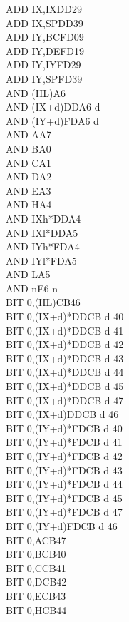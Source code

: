 \documentclass[oneside,a4paper]{book}
\begin{document}
\begin{multicols}{3}
{\begin{tabbing}
ADD IX,IX\>DD29\\
ADD IX,SP\>DD39\\
ADD IY,BC\>FD09\\
ADD IY,DE\>FD19\\
ADD IY,IY\>FD29\\
ADD IY,SP\>FD39\\
AND (HL)\>A6\\
AND (IX+d)\>DDA6 d\\
AND (IY+d)\>FDA6 d\\
AND A\>A7\\
AND B\>A0\\
AND C\>A1\\
AND D\>A2\\
AND E\>A3\\
AND H\>A4\\
AND IXh*\>DDA4\\
AND IXl*\>DDA5\\
AND IYh*\>FDA4\\
AND IYl*\>FDA5\\
AND L\>A5\\
AND n\>E6 n\\
BIT 0,(HL)\>CB46\\
BIT 0,(IX+d)*\>DDCB d 40\\
BIT 0,(IX+d)*\>DDCB d 41\\
BIT 0,(IX+d)*\>DDCB d 42\\
BIT 0,(IX+d)*\>DDCB d 43\\
BIT 0,(IX+d)*\>DDCB d 44\\
BIT 0,(IX+d)*\>DDCB d 45\\
BIT 0,(IX+d)*\>DDCB d 47\\
BIT 0,(IX+d)\>DDCB d 46\\
BIT 0,(IY+d)*\>FDCB d 40\\
BIT 0,(IY+d)*\>FDCB d 41\\
BIT 0,(IY+d)*\>FDCB d 42\\
BIT 0,(IY+d)*\>FDCB d 43\\
BIT 0,(IY+d)*\>FDCB d 44\\
BIT 0,(IY+d)*\>FDCB d 45\\
BIT 0,(IY+d)*\>FDCB d 47\\
BIT 0,(IY+d)\>FDCB d 46\\
BIT 0,A\>CB47\\
BIT 0,B\>CB40\\
BIT 0,C\>CB41\\
BIT 0,D\>CB42\\
BIT 0,E\>CB43\\
BIT 0,H\>CB44\\

\end{tabbing}}
\end{multicols}
\end{document}
